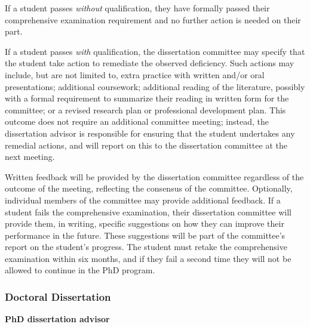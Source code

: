 If a student passes \textit{without} qualification, they have formally
passed their comprehensive examination requirement and no further
action is needed on their part.

If a student passes \textit{with} qualification, the dissertation committee
may specify that the student take action to remediate the observed
deficiency.  Such actions may include, but are not limited to, extra
practice with written and/or oral presentations; additional
coursework; additional reading of the literature, possibly with a
formal requirement to summarize their reading in written form for the
committee; or a revised research plan or professional development
plan.  This outcome does not require an additional committee meeting;
instead, the dissertation advisor is responsible for ensuring that the
student undertakes any remedial actions, and will report on this to
the dissertation committee at the next meeting.

Written feedback will be provided by the dissertation committee
regardless of the outcome of the meeting, reflecting the consensus of
the committee.  Optionally, individual members of the committee may
provide additional feedback.
If a student fails the comprehensive examination, their dissertation
committee will provide them, in writing, specific suggestions on
how they can improve their performance in the future.  These
suggestions will be part of the committee's report on the student's
progress.  The student must retake
the comprehensive examination within six months, and if they fail a
second time they will not be allowed to continue in the PhD program.


\vspace{3mm}
\subsubsection{Doctoral Dissertation}
\label{sec:phd_dissertation}

\vspace{3mm}
\noindent
\textbf{PhD dissertation advisor}

